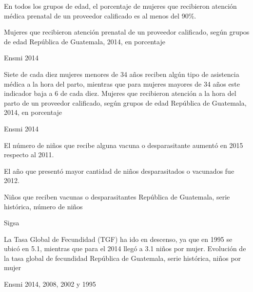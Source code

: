 
%
{%

En todos los grupos de edad, el porcentaje de mujeres que recibieron atención médica prenatal de un proveedor calificado es al menos del 90\%. 
}%
{%
	Mujeres que recibieron atención prenatal de un proveedor calificado, según grupos de edad} %
{%
	República de Guatemala, 2014, en porcentaje} %
{%
	\begin{tikzpicture}[x=1pt,y=1pt]    \end{tikzpicture}}%
{%
	Ensmi 2014} %


%
{%
	Siete de cada diez mujeres menores de 34 años reciben algún tipo de asistencia médica a la hora del parto, mientras que para mujeres mayores de 34 años este indicador baja a 6 de cada diez. 
}%
{%
	Mujeres que recibieron atención a la hora del parto  de un proveedor calificado, según grupos de edad} %
{%
	República de Guatemala, 2014, en porcentaje} %
{%
	\begin{tikzpicture}[x=1pt,y=1pt]    \end{tikzpicture}}%
{%
	Ensmi 2014} %




%
{%
	El número de niños que recibe alguna vacuna o desparasitante aumentó en 2015 respecto al 2011. 
	
	El año que presentó mayor cantidad de niños desparasitados o vacunados fue  2012.
}%
{%
	Niños que reciben vacunas o desparasitantes} %
{%
	República de Guatemala, serie histórica, número de niños} %
{%
	\begin{tikzpicture}[x=1pt,y=1pt]    \end{tikzpicture}}%
{%
	Sigsa} %


%
{%
	La Tasa Global de Fecundidad (TGF) ha ido en descenso, ya que en 1995 se ubicó en 5.1, mientras que para el 2014 llegó a 3.1 niños por mujer. 
}%
{%
	Evolución de la tasa global de fecundidad} %
{%
	República de Guatemala, serie histórica, niños por mujer} %
{%
	\begin{tikzpicture}[x=1pt,y=1pt]    \end{tikzpicture}}%
{%
	Ensmi 2014, 2008, 2002 y 1995} %

